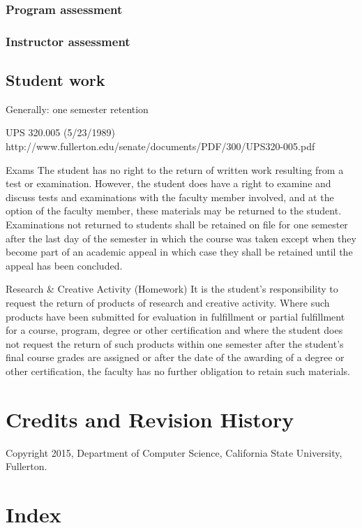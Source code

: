 \documentclass{book}
\begin{document}
\subsection{Program assessment}
\subsection{Instructor assessment}

\section{Student work}
Generally: one semester retention

UPS 320.005 (5/23/1989)
http://www.fullerton.edu/senate/documents/PDF/300/UPS320-005.pdf

Exams
The student has no right to the return of written work resulting from a test or examination. However, the student does have a right to examine and discuss tests and examinations with the faculty member involved, and at the option of the faculty member, these materials may be returned to the student. Examinations not returned to students shall be retained on file for one semester after the last day of the semester in which the course was taken except when they become part of an academic appeal in which case they shall be retained until the appeal has been concluded.

Research & Creative Activity (Homework)
It is the student's responsibility to request the return of products of research and creative activity. Where such products have been submitted for evaluation in fulfillment or partial fulfillment for a course, program, degree or other certification and where the student does not request the return of such products within one semester after the student's final course grades are assigned or after the date of the awarding of a degree or other certification, the faculty has no further obligation to retain such materials.

\chapter{Credits and Revision History}

Copyright 2015, Department of Computer Science, California State University, Fullerton.

\chapter{Index}
\printindex
\end{document}
